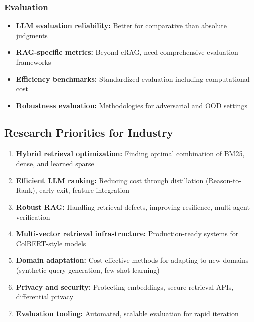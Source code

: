 \documentclass[11pt,letterpaper]{article}
\begin{document}
\subsubsection{Evaluation}
\begin{itemize}[leftmargin=*]
    \item \textbf{LLM evaluation reliability:} Better for comparative than absolute judgments
    \item \textbf{RAG-specific metrics:} Beyond eRAG, need comprehensive evaluation frameworks
    \item \textbf{Efficiency benchmarks:} Standardized evaluation including computational cost
    \item \textbf{Robustness evaluation:} Methodologies for adversarial and OOD settings
\end{itemize}

\subsection{Research Priorities for Industry}

\begin{enumerate}[leftmargin=*]
    \item \textbf{Hybrid retrieval optimization:} Finding optimal combination of BM25, dense, and learned sparse

    \item \textbf{Efficient LLM ranking:} Reducing cost through distillation (Reason-to-Rank), early exit, feature integration

    \item \textbf{Robust RAG:} Handling retrieval defects, improving resilience, multi-agent verification

    \item \textbf{Multi-vector retrieval infrastructure:} Production-ready systems for ColBERT-style models

    \item \textbf{Domain adaptation:} Cost-effective methods for adapting to new domains (synthetic query generation, few-shot learning)

    \item \textbf{Privacy and security:} Protecting embeddings, secure retrieval APIs, differential privacy

    \item \textbf{Evaluation tooling:} Automated, scalable evaluation for rapid iteration
\end{enumerate}
\end{document}
